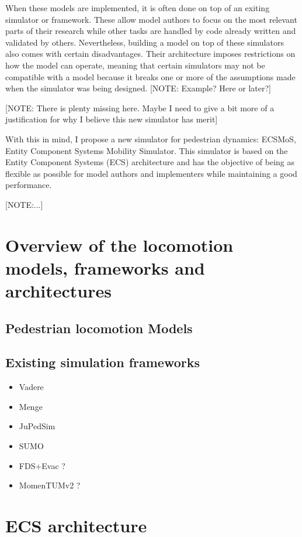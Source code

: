 \documentclass[twoside, 11pt]{article}
\begin{document}
When these models are implemented, it is often done on top of an exiting simulator or framework. These allow model authors to focus on the most relevant parts of their research while other tasks are handled by code already written and validated by others. Nevertheless, building a model on top of these simulators also comes with certain disadvantages. Their architecture imposes restrictions on how the model can operate, meaning that certain simulators may not be compatible with a model because it breaks one or more of the assumptions made when the simulator was being designed. [NOTE: Example? Here or later?]

[NOTE: There is plenty missing here. Maybe I need to give a bit more of a justification for why I believe this new simulator has merit]

With this in mind, I propose a new simulator for pedestrian dynamics: ECSMoS, Entity Component Systems Mobility Simulator. This simulator is based on the Entity Component Systems (ECS) architecture and has the objective of being as flexible as possible for model authors and implementers while maintaining a good performance.

[NOTE:...]

\section{Overview of the locomotion models, frameworks and architectures} \label{overview}

\subsection{Pedestrian locomotion Models}

\subsection{Existing simulation frameworks}

\begin{itemize}
  \item Vadere
  \item Menge
  \item JuPedSim
  \item SUMO
  \item FDS+Evac ?
  \item MomenTUMv2 ?
\end{itemize}

\section{ECS architecture}
\end{document}
